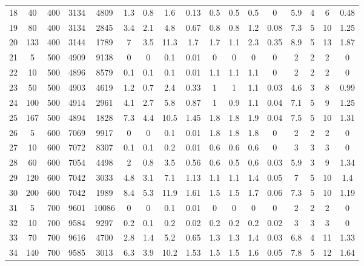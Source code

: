 \documentclass[11pt]{article}
\newcommand{\np}{\newpage}
\begin{document}
\begin{appendices}
\begin{landscape}
\begin{longtable}[c]{ccccc|cccc|cccc|cccc}
				18 & 40 & 400 & 3134 & 4809 & 1.3 & 0.8 & 1.6 & 0.13 & 0.5 & 0.5 & 0.5 & 0 & 5.9 & 4 & 6 & 0.48 \\
				19 & 80 & 400 & 3134 & 2845 & 3.4 & 2.1 & 4.8 & 0.67 & 0.8 & 0.8 & 1.2 & 0.08 & 7.3 & 5 & 10 & 1.25 \\
				20 & 133 & 400 & 3144 & 1789 & 7 & 3.5 & 11.3 & 1.7 & 1.7 & 1.1 & 2.3 & 0.35 & 8.9 & 5 & 13 & 1.87 \\ \np
				\rowcolor[HTML]{EFEFEF} 
				21 & 5 & 500 & 4909 & 9138 & 0 & 0 & 0.1 & 0.01 & 0 & 0 & 0 & 0 & 2 & 2 & 2 & 0 \\
				\rowcolor[HTML]{EFEFEF} 
				22 & 10 & 500 & 4896 & 8579 & 0.1 & 0.1 & 0.1 & 0.01 & 1.1 & 1.1 & 1.1 & 0 & 2 & 2 & 2 & 0 \\
				\rowcolor[HTML]{EFEFEF} 
				23 & 50 & 500 & 4903 & 4619 & 1.2 & 0.7 & 2.4 & 0.33 & 1 & 1 & 1.1 & 0.03 & 4.6 & 3 & 8 & 0.99 \\
				\rowcolor[HTML]{EFEFEF} 
				24 & 100 & 500 & 4914 & 2961 & 4.1 & 2.7 & 5.8 & 0.87 & 1 & 0.9 & 1.1 & 0.04 & 7.1 & 5 & 9 & 1.25 \\
				\rowcolor[HTML]{EFEFEF} 
				25 & 167 & 500 & 4894 & 1828 & 7.3 & 4.4 & 10.5 & 1.45 & 1.8 & 1.8 & 1.9 & 0.04 & 7.5 & 5 & 10 & 1.31 \\
				26 & 5 & 600 & 7069 & 9917 & 0 & 0 & 0.1 & 0.01 & 1.8 & 1.8 & 1.8 & 0 & 2 & 2 & 2 & 0 \\
				27 & 10 & 600 & 7072 & 8307 & 0.1 & 0.1 & 0.2 & 0.01 & 0.6 & 0.6 & 0.6 & 0 & 3 & 3 & 3 & 0 \\
				28 & 60 & 600 & 7054 & 4498 & 2 & 0.8 & 3.5 & 0.56 & 0.6 & 0.5 & 0.6 & 0.03 & 5.9 & 3 & 9 & 1.34 \\
				29 & 120 & 600 & 7042 & 3033 & 4.8 & 3.1 & 7.1 & 1.13 & 1.1 & 1.1 & 1.4 & 0.05 & 7 & 5 & 10 & 1.4 \\
				30 & 200 & 600 & 7042 & 1989 & 8.4 & 5.3 & 11.9 & 1.61 & 1.5 & 1.5 & 1.7 & 0.06 & 7.3 & 5 & 10 & 1.19 \\
				\rowcolor[HTML]{EFEFEF} 
				31 & 5 & 700 & 9601 & 10086 & 0 & 0 & 0.1 & 0.01 & 0 & 0 & 0 & 0 & 2 & 2 & 2 & 0 \\
				\rowcolor[HTML]{EFEFEF} 
				32 & 10 & 700 & 9584 & 9297 & 0.2 & 0.1 & 0.2 & 0.02 & 0.2 & 0.2 & 0.2 & 0.02 & 3 & 3 & 3 & 0 \\
				\rowcolor[HTML]{EFEFEF} 
				33 & 70 & 700 & 9616 & 4700 & 2.8 & 1.4 & 5.2 & 0.65 & 1.3 & 1.3 & 1.4 & 0.03 & 6.8 & 4 & 11 & 1.33 \\
				\rowcolor[HTML]{EFEFEF} 
				34 & 140 & 700 & 9585 & 3013 & 6.3 & 3.9 & 10.2 & 1.53 & 1.5 & 1.5 & 1.6 & 0.05 & 7.8 & 5 & 12 & 1.64 \\

\end{longtable}
\end{landscape}
\end{appendices}
\end{document}

